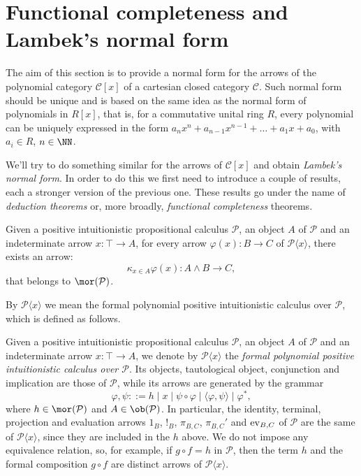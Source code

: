 \section{Functional completeness and Lambek's normal form}
The aim of this section is to provide a normal form for the arrows of the polynomial category $\mathcal C[x]$ of a cartesian closed category $\mathcal C$.
Such normal form should be unique and is based on the same idea as the normal form of polynomials in $R[x]$, that is, for a commutative unital ring $R$,
every polynomial can be uniquely expressed in the form $a_n x^n + a_{n-1} x^{n-1} + \ldots + a_1 x + a_0$, with $a_i \in R$, $n \in \NN$.\par
We'll try to do something similar for the arrows of $\mathcal C[x]$ and obtain \textit{Lambek's normal form}. In order to do this we first need to introduce a couple 
of results, each a stronger version of the previous one. These results go under the name of \textit{deduction theorems} or, more broadly, \textit{functional completeness} theorems.

\begin{theorem}
    Given a positive intuitionistic propositional calculus $\mathcal P$, an object $A$ of $\mathcal P$ and an indeterminate arrow $x : \top \to A$,
    for every arrow $\varphi(x) : B \to C$ of $\mathcal P\langle x\rangle$, there exists an arrow:
    \[ \kappa_{x \in A}\varphi(x) : A \land B \to C, \]
    that belongs to $\mor(\mathcal P)$.
\end{theorem}

By $\mathcal P\langle x\rangle$ we mean the formal polynomial positive intuitionistic calculus over $\mathcal P$, which is defined as follows.

\begin{definition}
    Given a positive intuitionistic propositional calculus $\mathcal P$, an object $A$ of $\mathcal P$ and an indeterminate arrow $x : \top \to A$, we denote by
    $\mathcal P\langle x\rangle$ the \textit{formal polynomial positive intuitionistic calculus over $\mathcal P$}. Its objects, tautological object, conjunction and implication are those of
    $\mathcal P$, while its arrows are generated by the grammar
    \[ \varphi,\psi ::= h \mid x \mid \psi \circ \varphi \mid \langle \varphi,\psi\rangle \mid \varphi^*, \]
    where $h \in \mor(\mathcal P)$ and $A \in \ob(\mathcal P)$. In particular, the identity, terminal, projection and evaluation arrows $1_B$, $!_B$, $\pi_{B,C}$, $\pi_{B,C}'$ and $\textnormal{ev}_{B,C}$ of $\mathcal P$ are the same of $\mathcal P\langle x \rangle$, since they are included in the $h$ above.
    We do not impose any equivalence relation, so, for example, if $g \circ f = h$ in $\mathcal P$, then the term $h$ and the formal composition $g \circ f$ are distinct arrows of $\mathcal P\langle x\rangle$.
\end{definition}

